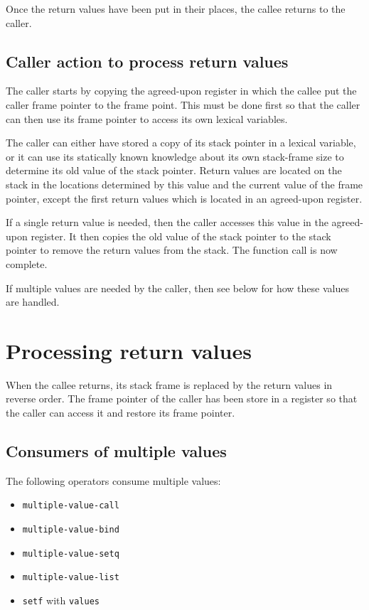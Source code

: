 Once the return values have been put in their places, the callee
returns to the caller.

\subsection{Caller action to process return values}

The caller starts by copying the agreed-upon register in which the
callee put the caller frame pointer to the frame point.  This must be
done first so that the caller can then use its frame pointer to access
its own lexical variables.

The caller can either have stored a copy of its stack pointer in a
lexical variable, or it can use its statically known knowledge about
its own stack-frame size to determine its old value of the stack
pointer.  Return values are located on the stack in the locations
determined by this value and the current value of the frame pointer,
except the first return values which is located in an agreed-upon
register.

If a single return value is needed, then the caller accesses this
value in the agreed-upon register.  It then copies the old value of
the stack pointer to the stack pointer to remove the return values
from the stack.  The function call is now complete.

If multiple values are needed by the caller, then see below for how
these values are handled.

\section{Processing return values}

When the callee returns, its stack frame is replaced by the return
values in reverse order.  The frame pointer of the caller has been
store in a register so that the caller can access it and restore its
frame pointer.

\subsection{Consumers of multiple values}

The following operators consume multiple values:

\begin{itemize}
\item \texttt{multiple-value-call}
\item \texttt{multiple-value-bind}
\item \texttt{multiple-value-setq}
\item \texttt{multiple-value-list}
\item \texttt{setf} with \texttt{values}
\end{itemize}

